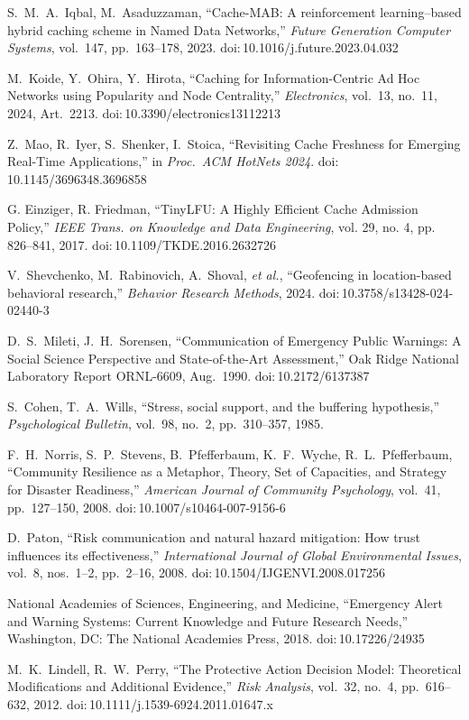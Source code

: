 \begin{thebibliography}{99}
S.\ M.\ A.\ Iqbal, M.\ Asaduzzaman, ``Cache-MAB: A reinforcement learning–based hybrid caching scheme in Named Data Networks,'' \emph{Future Generation Computer Systems}, vol.\ 147, pp.\ 163--178, 2023. doi:\,10.1016/j.future.2023.04.032

M.\ Koide, Y.\ Ohira, Y.\ Hirota, ``Caching for Information-Centric Ad Hoc Networks using Popularity and Node Centrality,'' \emph{Electronics}, vol.\ 13, no.\ 11, 2024, Art.\ 2213. doi:\,10.3390/electronics13112213

Z.\ Mao, R.\ Iyer, S.\ Shenker, I.\ Stoica, ``Revisiting Cache Freshness for Emerging Real-Time Applications,'' in \emph{Proc.\ ACM HotNets 2024}. doi:\,10.1145/3696348.3696858

G. Einziger, R. Friedman, ``TinyLFU: A Highly Efficient Cache Admission Policy,'' \emph{IEEE Trans. on Knowledge and Data Engineering}, vol. 29, no. 4, pp. 826--841, 2017. doi:\,10.1109/TKDE.2016.2632726

V.\ Shevchenko, M.\ Rabinovich, A.\ Shoval, \emph{et al.}, ``Geofencing in location-based behavioral research,'' \emph{Behavior Research Methods}, 2024. doi:\,10.3758/s13428-024-02440-3

D.\ S.\ Mileti, J.\ H.\ Sorensen, ``Communication of Emergency Public Warnings: A Social Science Perspective and State-of-the-Art Assessment,'' Oak Ridge National Laboratory Report ORNL-6609, Aug.\ 1990. doi:\,10.2172/6137387

S.\ Cohen, T.\ A.\ Wills, ``Stress, social support, and the buffering hypothesis,'' \emph{Psychological Bulletin}, vol.\ 98, no.\ 2, pp.\ 310--357, 1985.

F.\ H.\ Norris, S.\ P.\ Stevens, B.\ Pfefferbaum, K.\ F.\ Wyche, R.\ L.\ Pfefferbaum, ``Community Resilience as a Metaphor, Theory, Set of Capacities, and Strategy for Disaster Readiness,'' \emph{American Journal of Community Psychology}, vol.\ 41, pp.\ 127--150, 2008. doi:\,10.1007/s10464-007-9156-6

D.\ Paton, ``Risk communication and natural hazard mitigation: How trust influences its effectiveness,'' \emph{International Journal of Global Environmental Issues}, vol.\ 8, nos.\ 1--2, pp.\ 2--16, 2008. doi:\,10.1504/IJGENVI.2008.017256

National Academies of Sciences, Engineering, and Medicine, ``Emergency Alert and Warning Systems: Current Knowledge and Future Research Needs,'' Washington, DC: The National Academies Press, 2018. doi:\,10.17226/24935

M.\ K.\ Lindell, R.\ W.\ Perry, ``The Protective Action Decision Model: Theoretical Modifications and Additional Evidence,'' \emph{Risk Analysis}, vol.\ 32, no.\ 4, pp.\ 616--632, 2012. doi:\,10.1111/j.1539-6924.2011.01647.x

\end{thebibliography}
